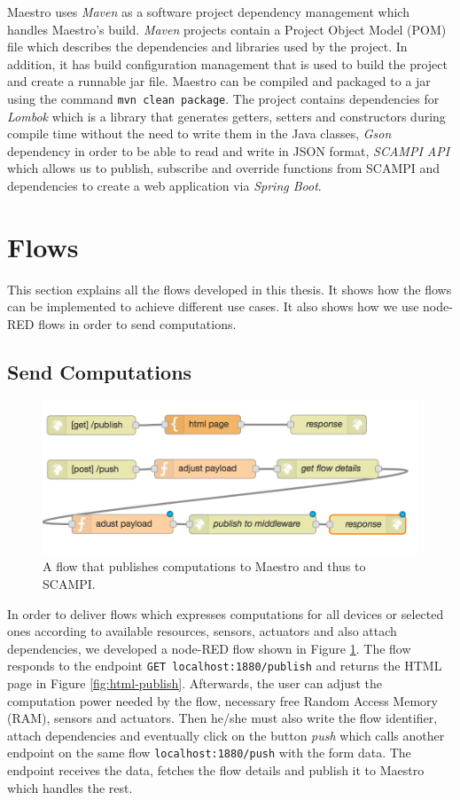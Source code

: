 \noindent Maestro uses \textit{Maven} as a  software project dependency management which handles Maestro's build. \textit{Maven} projects contain a Project Object Model (POM) file which describes the dependencies and libraries used by the project. In addition, it has build configuration management that is used to build the project and create a runnable jar file. Maestro can be compiled and packaged to a jar using the command \verb|mvn clean package|. The project contains dependencies for \textit{Lombok} which is a library that generates getters, setters and constructors during compile time without the need to write them in the Java classes, \textit{Gson} dependency in order to be able to read and write in JSON format, \textit{SCAMPI API} which allows us to publish, subscribe and override  functions from SCAMPI and dependencies to create a web application via \textit{Spring Boot}. \\

\section{Flows}
This section explains all the flows developed in this thesis. It shows how the flows can be implemented to achieve different use cases. It also shows how we use node-RED flows in order to send computations.
\subsection{Send Computations}\label{subsec:send-comp}
 \begin{figure}[H]
	\centering
	\includegraphics[scale=0.6]{images/flow-publish-computation.png}
	\caption{A flow that publishes computations to Maestro and thus to SCAMPI.}
	\label{fig:flow-publish-computation}
	
\end{figure}

In order to deliver flows which expresses computations for all devices or selected ones according to available resources,  sensors, actuators and also attach dependencies, we developed a node-RED flow shown in Figure \ref{fig:flow-publish-computation}. The flow responds to the endpoint \verb|GET localhost:1880/publish| and returns the HTML page in Figure \ref{fig:html-publish}. Afterwards, the user can adjust the computation power needed by the flow, necessary free Random Access Memory (RAM), sensors and actuators. Then he/she must also write the flow identifier, attach dependencies and eventually click on the button \textit{push} which calls another endpoint on the same flow \verb|localhost:1880/push| with the form data. The endpoint receives the data, fetches the flow details and publish it to  Maestro which handles the rest.



